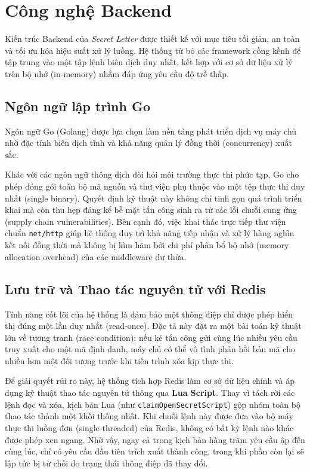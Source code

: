 \section{Công nghệ Backend}

Kiến trúc Backend của \textit{Secret Letter} được thiết kế với mục tiêu tối giản, an toàn và tối ưu hóa hiệu suất xử lý luồng. Hệ thống từ bỏ các framework cồng kềnh để tập trung vào một tập lệnh biên dịch duy nhất, kết hợp với cơ sở dữ liệu xử lý trên bộ nhớ (in-memory) nhằm đáp ứng yêu cầu độ trễ thấp.

\subsection{Ngôn ngữ lập trình Go}
Ngôn ngữ Go (Golang) được lựa chọn làm nền tảng phát triển dịch vụ máy chủ nhờ đặc tính biên dịch tĩnh và khả năng quản lý đồng thời (concurrency) xuất sắc. 

Khác với các ngôn ngữ thông dịch đòi hỏi môi trường thực thi phức tạp, Go cho phép đóng gói toàn bộ mã nguồn và thư viện phụ thuộc vào một tệp thực thi duy nhất (single binary). Quyết định kỹ thuật này không chỉ tinh gọn quá trình triển khai mà còn thu hẹp đáng kể bề mặt tấn công sinh ra từ các lỗi chuỗi cung ứng (supply chain vulnerabilities). Bên cạnh đó, việc khai thác trực tiếp thư viện chuẩn \texttt{net/http} giúp hệ thống duy trì khả năng tiếp nhận và xử lý hàng nghìn kết nối đồng thời mà không bị kìm hãm bởi chi phí phân bổ bộ nhớ (memory allocation overhead) của các middleware dư thừa.

\subsection{Lưu trữ và Thao tác nguyên tử với Redis}
Tính năng cốt lõi của hệ thống là đảm bảo một thông điệp chỉ được phép hiển thị đúng một lần duy nhất (read-once). Đặc tả này đặt ra một bài toán kỹ thuật lớn về tương tranh (race condition): nếu kẻ tấn công gửi cùng lúc nhiều yêu cầu truy xuất cho một mã định danh, máy chủ có thể vô tình phản hồi bản mã cho nhiều hơn một đối tượng trước khi tiến trình xóa kịp thực thi.

Để giải quyết rủi ro này, hệ thống tích hợp Redis làm cơ sở dữ liệu chính và áp dụng kỹ thuật thao tác nguyên tử thông qua \textbf{Lua Script}. Thay vì tách rời các lệnh đọc và xóa, kịch bản Lua (như \texttt{claimOpenSecretScript}) gộp nhóm toàn bộ thao tác thành một khối thống nhất. Khi chuỗi lệnh này được đưa vào bộ máy thực thi luồng đơn (single-threaded) của Redis, không có bất kỳ lệnh nào khác được phép xen ngang. Nhờ vậy, ngay cả trong kịch bản hàng trăm yêu cầu ập đến cùng lúc, chỉ có yêu cầu đầu tiên trích xuất thành công, trong khi phần còn lại sẽ lập tức bị từ chối do trạng thái thông điệp đã thay đổi.

